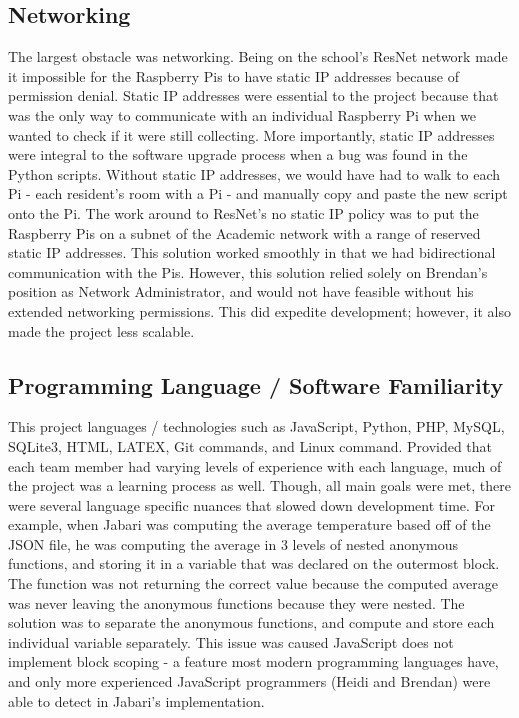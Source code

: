 \documentclass{article}
\begin{document}
		\subsection{Networking}						
			The largest obstacle was networking. Being on the school's ResNet network made it impossible for the Raspberry Pis to have static IP addresses 
			because of permission denial. Static IP addresses were essential to the project because that was the only way to communicate with an individual 
			Raspberry Pi when we wanted to check if it were still collecting. More importantly, static IP addresses were integral to the software upgrade 
			process when a bug was found in the Python scripts. Without static IP addresses, we would have had to walk to each Pi - each resident's room with 
			a Pi - and manually copy and paste the new script onto the Pi. The work around to ResNet's no static IP policy was to put the Raspberry Pis on a 	
			subnet of the Academic network with a range of reserved static IP addresses. This solution worked smoothly in that we had bidirectional 
			communication with the Pis. However, this solution relied solely on Brendan's position as Network Administrator, and would not have feasible 
			without his extended networking permissions. This did expedite development; however, it also made the project less scalable.
			
		\subsection{Programming Language / Software Familiarity}
			This project languages / technologies such as JavaScript, Python, PHP, MySQL, SQLite3, HTML, LATEX, Git commands, and Linux command. Provided
			that each team member had varying levels of experience with each language, much of the project was a learning process as well. Though, all main 
			goals were met, there were several language specific nuances that slowed down development time. For example, when Jabari was computing the average
			temperature based off of the JSON file, he was computing the average in 3 levels of nested anonymous functions, and storing it in a variable 
			that was declared on the outermost block. The function was not returning the correct value because the computed average was never leaving the 
			anonymous functions because they were nested. The solution was to separate the anonymous functions, and compute and store each individual variable 
			separately. This issue was caused JavaScript does not implement block scoping - a feature most modern programming languages have, and only more
			experienced JavaScript programmers (Heidi and Brendan) were able to detect in Jabari's implementation.
		
\end{document}
